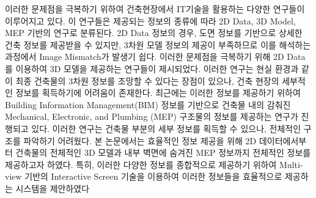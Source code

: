 이러한 문제점을 극복하기 위하여 건축현장에서 IT기술을 활용하는 다양한 연구들이 이루어지고 있다. 이 연구들은 제공되는 정보의 종류에 따라 2D Data, 3D Model, MEP 기반의 연구로 분류된다. 2D Data 정보의 경우, 도면 정보를 기반으로 상세한 건축 정보를 제공받을 수 있지만\cite{yeh_-site_2012,ishii_augmented_2002,cote_augmented_2013}, 3차원 모델 정보의 제공이 부족하므로 이를 해석하는 과정에서 Image Mismatch가 발생기 쉽다. 이러한 문제점을 극복하기 위해 2D Data를 이용하여 3D 모델을 제공하는 연구들이 제시되었다\cite{wagner_building_2012,dong_collaborative_2013, hou_combining_2014,behzadan_ubiquitous_2008,williams_bim2mar:_2015}. 이러한 연구는 현실 환경과 같이 최종 건축물의 3차원 정보를 조망할 수 있다는 장점이 있으나, 건축 현장의 세부적인 정보를 획득하기에 어려움이 존재한다. 최근에는 이러한 정보를 제공하기 위하여 Building Information Management(BIM) 정보를 기반으로 건축물 내의 감춰진 Mechanical, Electronic, and Plumbing (MEP) 구조물의 정보를 제공하는 연구가 진행되고 있다\cite{schall_handheld_2009,olbrich_augmented_2013,kwon_defect_2014,webster_augmented_????,golparvar-fard_d4ar4-dimensional_2009}. 이러한 연구는 건축물 부분의 세부 정보를 획득할 수 있으나, 전체적인 구조를 파악하기 어려웠다\cite{webster_augmented_????}. 본 논문에서는 효율적인 정보 제공을 위해 2D 데이터에서부터 건축물의 전체적인 3D 모델과 내부 벽면에 숨겨진 MEP 정보까지 전체적인 정보를 제공하고자 하였다. 특히, 이러한 다양한 정보를 종합적으로 제공하기 위하여 Multi-view 기반의 Interactive Screen 기술을 이용하여 이러한 정보들을 효율적으로 제공하는 시스템을 제안하였다

